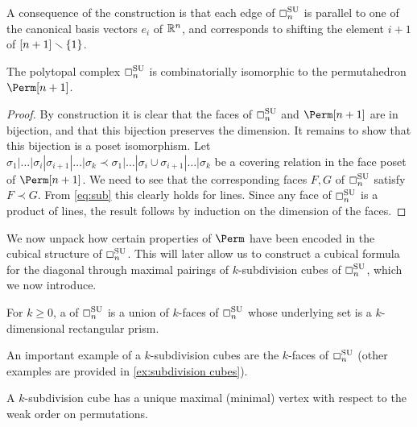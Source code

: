 \begin{remark}
\label{rem:coordinates}
A consequence of the construction is that each edge of $\Box_{n}^{\mathrm{SU}}$ is parallel to one of the canonical basis vectors $e_i$ of $\mathbb{R}^n$, and corresponds to shifting the element $i+1$ of $[n+1]\smallsetminus \{1\}$.
\end{remark}

\begin{proposition}
\label{prop:subdiv cube Combinatorially Isomorphic to perm}
The polytopal complex $\Box_{n}^{\mathrm{SU}}$ is combinatorially isomorphic to the permutahedron $\Perm[n+1]$.
\end{proposition}

\begin{proof}
By construction it is clear that the faces of $\Box_{n}^{\mathrm{SU}}$ and $\Perm[n+1]$ are in bijection, and that this bijection preserves the dimension. 
It remains to show that this bijection is a poset isomorphism.
Let $\sigma_1 | \ldots | \sigma_i | \sigma_{i+1} | \ldots | \sigma_k \prec \sigma_1 | \ldots | \sigma_i \cup \sigma_{i+1} | \ldots | \sigma_k$ be a covering relation in the face poset of $\Perm[n+1]$.
We need to see that the corresponding faces $F,G$ of $\Box_{n}^{\mathrm{SU}}$ satisfy $F \prec G$. 
From \cref{eq:sub} this clearly holds for lines.
Since any face of $\Box_{n}^{\mathrm{SU}}$ is a product of lines, the result follows by induction on the dimension of the faces.
\end{proof}

We now unpack how certain properties of $\Perm$ have been encoded in the cubical structure of $\Box_{n}^{\mathrm{SU}}$.
This will later allow us to construct a cubical formula for the diagonal through maximal pairings of $k$-subdivision cubes of $\Box_{n}^{\mathrm{SU}}$, which we now introduce.

\begin{definition} 
\label{def:Subdivisions}
For $k\geq 0$, a  of $\Box_{n}^{\mathrm{SU}}$ is a union of $k$-faces of $\Box_{n}^{\mathrm{SU}}$ whose underlying set is a $k$-dimensional rectangular prism.
\end{definition}

An important example of a $k$-subdivision cubes are the $k$-faces of $\Box_{n}^{\mathrm{SU}}$ (other examples are provided in \cref{ex:subdivision cubes}).

\begin{lemma}
\label{lem:k-subdiv cubes have max/min k faces}
A $k$-subdivision cube has a unique maximal (\resp minimal) vertex with respect to the weak order on permutations.
\end{lemma}

